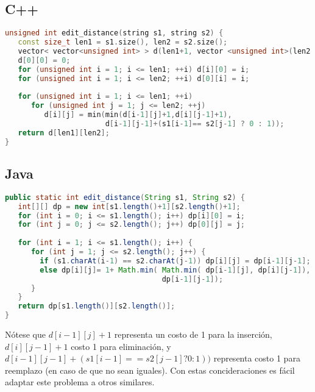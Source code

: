 \subsection{C++}
\begin{lstlisting}[language=C++]
unsigned int edit_distance(string s1, string s2) {
   const size_t len1 = s1.size(), len2 = s2.size();
   vector< vector<unsigned int> > d(len1+1, vector <unsigned int>(len2 + 1));
   d[0][0] = 0;
   for (unsigned int i = 1; i <= len1; ++i) d[i][0] = i;
   for (unsigned int i = 1; i <= len2; ++i) d[0][i] = i;
	
   for (unsigned int i = 1; i <= len1; ++i)
      for (unsigned int j = 1; j <= len2; ++j)
         d[i][j] = min(min(d[i-1][j]+1,d[i][j-1]+1),
                       d[i-1][j-1]+(s1[i-1]== s2[j-1] ? 0 : 1));
   return d[len1][len2];
}
\end{lstlisting} 
\subsection{Java}

\begin{lstlisting}[language=Java]
public static int edit_distance(String s1, String s2) {
   int[][] dp = new int[s1.length()+1][s2.length()+1];
   for (int i = 0; i <= s1.length(); i++) dp[i][0] = i;
   for (int j = 0; j <= s2.length(); j++) dp[0][j] = j;
	
   for (int i = 1; i <= s1.length(); i++) {
      for (int j = 1; j <= s2.length(); j++) {
      	if (s1.charAt(i-1) == s2.charAt(j-1)) dp[i][j] = dp[i-1][j-1];
        else dp[i][j]= 1+ Math.min( Math.min( dp[i-1][j], dp[i][j-1]),
                                    dp[i-1][j-1]);
      }
   }
   return dp[s1.length()][s2.length()];
}
\end{lstlisting}


Nótese que $d[i-1][j]+1$ representa un costo de 1 para la inserción, $d[i][j-1]+1$
 costo 1 para eliminación, y $d[i-1][j-1]+(s1[i-1] == s2[j-1]? 0 : 1))$ representa
costo 1 para reemplazo (en caso de que no sean iguales). Con estas concideraciones
es fácil adaptar este problema a otros similares.